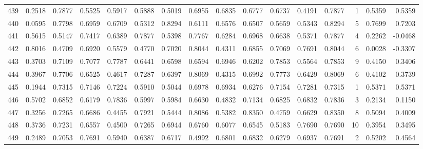 \begin{tabular}{lrrrrrrrrrrrrrrr}
439 &      0.2518 &  0.7877 &  0.5525 &  0.5917 &  0.5888 &  0.5019 &  0.6955 &  0.6835 &  0.6777 &  0.6737 &   0.4191 &     0.7877 &      1 &                    0.5359 &                     0.5359 \\
440 &      0.0595 &  0.7798 &  0.6959 &  0.6709 &  0.5312 &  0.8294 &  0.6111 &  0.6576 &  0.6507 &  0.5659 &   0.5343 &     0.8294 &      5 &                    0.7699 &                     0.7203 \\
441 &      0.5615 &  0.5147 &  0.7417 &  0.6389 &  0.7877 &  0.5398 &  0.7767 &  0.6284 &  0.6968 &  0.6638 &   0.5371 &     0.7877 &      4 &                    0.2262 &                    -0.0468 \\
442 &      0.8016 &  0.4709 &  0.6920 &  0.5579 &  0.4770 &  0.7020 &  0.8044 &  0.4311 &  0.6855 &  0.7069 &   0.7691 &     0.8044 &      6 &                    0.0028 &                    -0.3307 \\
443 &      0.3703 &  0.7109 &  0.7077 &  0.7787 &  0.6441 &  0.6598 &  0.6594 &  0.6946 &  0.6202 &  0.7853 &   0.5564 &     0.7853 &      9 &                    0.4150 &                     0.3406 \\
444 &      0.3967 &  0.7706 &  0.6525 &  0.4617 &  0.7287 &  0.6397 &  0.8069 &  0.4315 &  0.6992 &  0.7773 &   0.6429 &     0.8069 &      6 &                    0.4102 &                     0.3739 \\
445 &      0.1944 &  0.7315 &  0.7146 &  0.7224 &  0.5910 &  0.5044 &  0.6978 &  0.6934 &  0.6276 &  0.7154 &   0.7281 &     0.7315 &      1 &                    0.5371 &                     0.5371 \\
446 &      0.5702 &  0.6852 &  0.6179 &  0.7836 &  0.5997 &  0.5984 &  0.6630 &  0.4832 &  0.7134 &  0.6825 &   0.6832 &     0.7836 &      3 &                    0.2134 &                     0.1150 \\
447 &      0.3256 &  0.7265 &  0.6686 &  0.4455 &  0.7921 &  0.5444 &  0.8086 &  0.5382 &  0.8350 &  0.4759 &   0.6629 &     0.8350 &      8 &                    0.5094 &                     0.4009 \\
448 &      0.3736 &  0.7231 &  0.6557 &  0.4500 &  0.7265 &  0.6944 &  0.6760 &  0.6077 &  0.6545 &  0.5183 &   0.7690 &     0.7690 &     10 &                    0.3954 &                     0.3495 \\
449 &      0.2489 &  0.7053 &  0.7691 &  0.5940 &  0.6387 &  0.6717 &  0.4992 &  0.6801 &  0.6832 &  0.6279 &   0.6937 &     0.7691 &      2 &                    0.5202 &                     0.4564 \\

\end{tabular}
